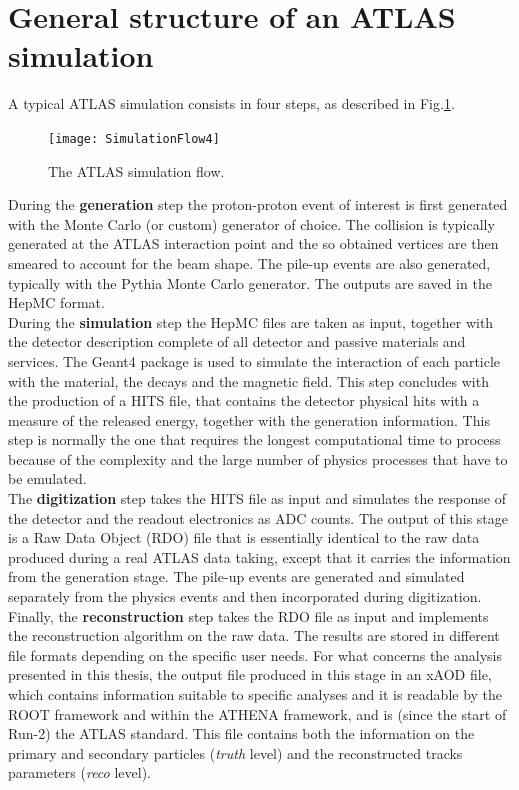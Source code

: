 \documentclass[a4paper,twoside,12pt]{book}
\begin{document}
\section{General structure of an ATLAS \\ 
simulation}
A typical ATLAS simulation consists in four steps, as described in Fig.\ref{fig:simulationFlow}.

\begin{figure} [h]
	\texttt{[image: SimulationFlow4]}
	\caption{The ATLAS simulation flow. }
	\label{fig:simulationFlow}
\end{figure}

During the \textbf{generation} step the proton-proton event of interest is first generated with the Monte
Carlo (or custom) generator of choice. The collision is typically generated at the ATLAS 
interaction point and the so obtained vertices are then smeared to account for the beam 
shape. The pile-up events are also generated, typically with the Pythia Monte Carlo generator. The outputs are saved in the HepMC format.\\

During the \textbf{simulation} step the HepMC files are taken as input, together with
the detector description complete of all detector and passive materials and services. 
The Geant4 package\cite{Geant4} is used to simulate the interaction of each particle with the material, the decays and the
magnetic field. This
step concludes with the production of a HITS file, that contains the detector physical hits
with a measure of the released energy, together with the generation information. This step 
is normally the one that requires the longest computational time to process because of the
complexity and the large number of physics processes that have to be emulated.\\

The \textbf{digitization} step takes the HITS file as input and simulates the response of the 
detector and the readout electronics as ADC counts. The output of this stage is a Raw Data
Object (RDO) file that is essentially identical to the raw data produced during a real 
ATLAS data taking, except that it carries the information from the generation stage. The pile-up
events are generated and simulated separately from the physics events and then incorporated during digitization.\\

Finally, the \textbf{reconstruction} step takes the RDO file as input and implements
the reconstruction algorithm on the raw data. The results are stored in different file formats
depending on the specific user needs\cite{ATLASFormats}. For what concerns the analysis presented in this thesis,
the output file produced in this stage in an xAOD file, which contains information suitable to specific analyses and it is readable by the ROOT framework\cite {ROOT} and 
within the ATHENA framework\cite{Athena}, and is (since the start of Run-2) the ATLAS standard. This file contains both the information on the primary and secondary particles (\textit{truth} level) and
the reconstructed tracks parameters (\textit{reco} level).\\
\end{document}

